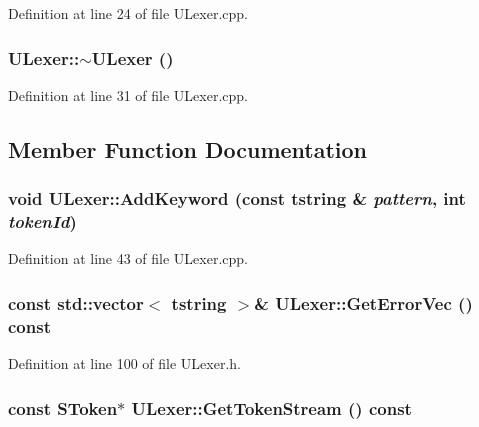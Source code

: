 Definition at line 24 of file ULexer.cpp.\hypertarget{class_u_lexer_6605340b309ce0685abd29a8a4ba56cb}{
\subsubsection[{$\sim$ULexer}]{\setlength{\rightskip}{0pt plus 5cm}ULexer::$\sim$ULexer ()}}
\label{class_u_lexer_6605340b309ce0685abd29a8a4ba56cb}




Definition at line 31 of file ULexer.cpp.

\subsection{Member Function Documentation}
\hypertarget{class_u_lexer_5f459ae48c6e2bcb58e384fe08275853}{
\subsubsection[{AddKeyword}]{\setlength{\rightskip}{0pt plus 5cm}void ULexer::AddKeyword (const {\bf tstring} \& {\em pattern}, \/  int {\em tokenId})}}
\label{class_u_lexer_5f459ae48c6e2bcb58e384fe08275853}




Definition at line 43 of file ULexer.cpp.\hypertarget{class_u_lexer_24d10ce8753d4c9703a2b376ceeb1756}{
\subsubsection[{GetErrorVec}]{\setlength{\rightskip}{0pt plus 5cm}const std::vector$<$ {\bf tstring} $>$\& ULexer::GetErrorVec () const}}
\label{class_u_lexer_24d10ce8753d4c9703a2b376ceeb1756}




Definition at line 100 of file ULexer.h.\hypertarget{class_u_lexer_6402fd28ffe0217e7a86ce78fc943b79}{
\subsubsection[{GetTokenStream}]{\setlength{\rightskip}{0pt plus 5cm}const {\bf SToken}$\ast$ ULexer::GetTokenStream () const}}
\label{class_u_lexer_6402fd28ffe0217e7a86ce78fc943b79}




